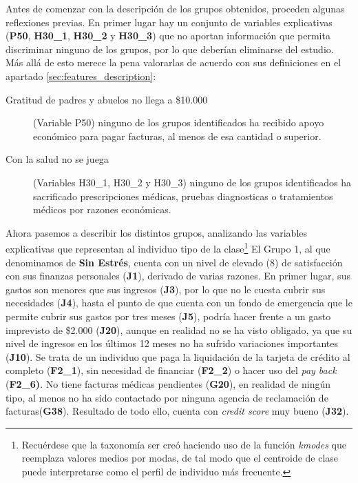 \documentclass[a4paper, 11pt]{article}
\begin{document}
Antes de comenzar con la descripción de los grupos obtenidos, proceden algunas reflexiones 
previas. En primer lugar hay un conjunto de variables explicativas (\textbf{P50}, 
\textbf{H30\_1}, \textbf{H30\_2} y \textbf{H30\_3}) que no aportan información que permita
discriminar ninguno de los grupos, por lo que deberían eliminarse del estudio. Más allá de 
esto merece la pena valorarlas de acuerdo con sus definiciones en el apartado
\ref{sec:features_description}:
\begin{description}
    \item[Gratitud de padres y abuelos no llega a \$10.000] (Variable P50) ninguno de 
    los grupos identificados ha recibido apoyo económico para pagar facturas, al menos de esa 
    cantidad o superior.
    \item[Con la salud no se juega] (Variables H30\_1, H30\_2 y H30\_3) ninguno de los grupos 
    identificados ha sacrificado prescripciones médicas, pruebas diagnosticas o tratamientos 
    médicos por razones económicas.
\end{description}

Ahora pasemos a describir los distintos grupos, analizando las variables explicativas que 
representan al individuo tipo de la clase\footnote{Recuérdese que la taxonomía ser creó haciendo
uso de la función \textit{kmodes} que reemplaza valores medios por modas, de tal modo que el centroide
de clase puede interpretarse como el perfil de individuo más frecuente.} El Grupo 1, al que
denominamos de \textbf{Sin Estrés}, cuenta con un nivel de elevado (8) de satisfacción
con sus finanzas personales (\textbf{J1}), derivado de varias razones. En primer lugar, sus gastos
son menores que sus ingresos (\textbf{J3}), por lo que no le cuesta cubrir sus necesidades 
(\textbf{J4}), hasta el punto de que cuenta con un fondo de emergencia que le permite cubrir
sus gastos por tres meses (\textbf{J5}), podría hacer frente a un gasto imprevisto de \$2.000
(\textbf{J20}), aunque en realidad no se ha visto obligado, ya que su nivel de ingresos en los
últimos 12 meses no ha sufrido variaciones importantes (\textbf{J10}). Se trata de un individuo
que paga la liquidación de la tarjeta de crédito al completo (\textbf{F2\_1}), sin necesidad de  
financiar (\textbf{F2\_2}) o hacer uso del \textit{pay back} (\textbf{F2\_6)}. No tiene facturas
médicas pendientes (\textbf{G20}), en realidad de ningún tipo, al menos no ha sido 
contactado por ninguna agencia de reclamación de facturas(\textbf{G38}).
Resultado de todo ello, cuenta con \textit{credit score} muy bueno (\textbf{J32}). 
\end{document}
